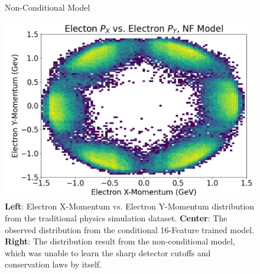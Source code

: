 \begin{figure}[H]
\begin{minipage}{0.31323\textwidth}
            \end{minipage}
                 \begin{minipage}{0.31323\textwidth}
                \centering
                Non-Conditional Model

                \includegraphics[width=.99\textwidth,trim={0 0 0 0},clip]{Chapters/Ch3-Simulations/normalizing_flows/nonconditional.png}
            \end{minipage}
            \caption[Conditional and Non-conditional Responses]{\textbf{Left}: Electron X-Momentum vs. Electron Y-Momentum distribution from the traditional physics simulation dataset. \textbf{Center}: The observed distribution from the conditional 16-Feature trained model. \textbf{Right}: The distribution result from the non-conditional model, which was unable to learn the sharp detector cutoffs and conservation laws by itself.}
            \label{fig:electron_xy_comp}
        \end{figure}


